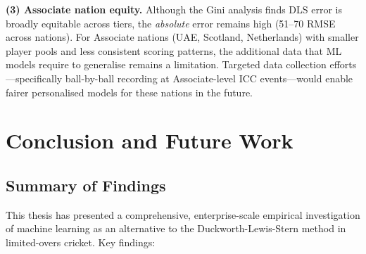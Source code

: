 \documentclass[12pt,a4paper,oneside]{report}
\begin{document}
\textbf{(3) Associate nation equity.}  Although the Gini analysis finds DLS error is broadly equitable across tiers, the \emph{absolute} error remains high (51--70 RMSE across nations).  For Associate nations (UAE, Scotland, Netherlands) with smaller player pools and less consistent scoring patterns, the additional data that ML models require to generalise remains a limitation.  Targeted data collection efforts---specifically ball-by-ball recording at Associate-level ICC events---would enable fairer personalised models for these nations in the future.

\chapter{Conclusion and Future Work}
\label{ch:conclusion}

\section{Summary of Findings}

This thesis has presented a comprehensive, enterprise-scale empirical investigation of machine learning as an alternative to the Duckworth-Lewis-Stern method in limited-overs cricket.  Key findings:
\end{document}
